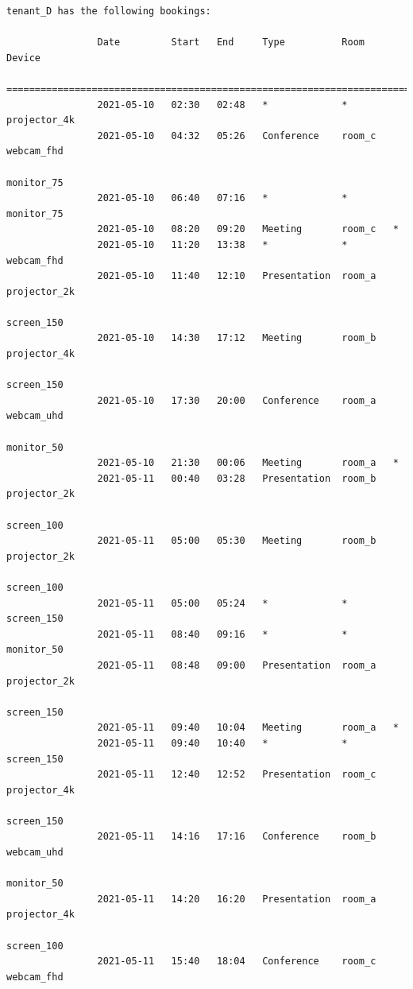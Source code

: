 \documentclass{article}
\begin{document}
\begin{Verbatim}[gobble=8]
                tenant_D has the following bookings:
                
                Date         Start   End     Type          Room     Device
                ===========================================================================
                2021-05-10   02:30   02:48   *             *        projector_4k
                2021-05-10   04:32   05:26   Conference    room_c   webcam_fhd
                                                                    monitor_75
                2021-05-10   06:40   07:16   *             *        monitor_75
                2021-05-10   08:20   09:20   Meeting       room_c   *
                2021-05-10   11:20   13:38   *             *        webcam_fhd
                2021-05-10   11:40   12:10   Presentation  room_a   projector_2k
                                                                    screen_150
                2021-05-10   14:30   17:12   Meeting       room_b   projector_4k
                                                                    screen_150
                2021-05-10   17:30   20:00   Conference    room_a   webcam_uhd
                                                                    monitor_50
                2021-05-10   21:30   00:06   Meeting       room_a   *
                2021-05-11   00:40   03:28   Presentation  room_b   projector_2k
                                                                    screen_100
                2021-05-11   05:00   05:30   Meeting       room_b   projector_2k
                                                                    screen_100
                2021-05-11   05:00   05:24   *             *        screen_150
                2021-05-11   08:40   09:16   *             *        monitor_50
                2021-05-11   08:48   09:00   Presentation  room_a   projector_2k
                                                                    screen_150
                2021-05-11   09:40   10:04   Meeting       room_a   *
                2021-05-11   09:40   10:40   *             *        screen_150
                2021-05-11   12:40   12:52   Presentation  room_c   projector_4k
                                                                    screen_150
                2021-05-11   14:16   17:16   Conference    room_b   webcam_uhd
                                                                    monitor_50
                2021-05-11   14:20   16:20   Presentation  room_a   projector_4k
                                                                    screen_100
                2021-05-11   15:40   18:04   Conference    room_c   webcam_fhd

\end{Verbatim}
\end{document}
